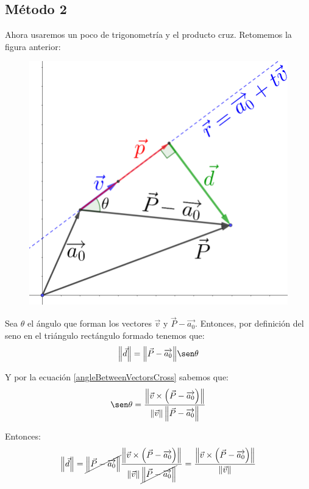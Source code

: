 \documentclass[12pt, fleqn]{report}                             %
\theoremstyle{break}                                            %
\newcommand{\Wrap}[1]{\left( #1 \right)}                        %
\newcommand{\Abs}[1]{\left\lVert #1 \right\lVert}               %
\newcommand{\lVec}[1]{\overrightarrow{#1}}                      %
\begin{document}
	    	\subsection{Método 2}
	    	Ahora usaremos un poco de trigonometría y el producto cruz. Retomemos la figura anterior:
	    	
	    	\begin{figure}[H]
	    		\centering
	    		\includegraphics[scale=1.65]{distancePointLine2.png}
	    	\end{figure}
    	
    		Sea $\theta$ el ángulo que forman los vectores $\vec{v}$ y $\vec{P} - \lVec{a_0}$. Entonces, por definición del seno en el triángulo rectángulo formado tenemos que:
    		\begin{align}
	    		\Abs{\vec{d}} = {\Abs{\vec{P} - \lVec{a_0}}} \sen \theta
    		\end{align}
    		
    		Y por la ecuación \ref{angleBetweenVectorsCross} sabemos que:
    		\begin{align}
	    		\sen \theta = \dfrac{\Abs{\vec{v} \times \Wrap{\vec{P} - \lVec{a_0}}}}{\Abs{\vec{v}} \Abs{\vec{P} - \lVec{a_0}}}
    		\end{align}
    		
    		Entonces:
    		\begin{align}
	    		\Abs{\vec{d}} = {\cancel{\Abs{\vec{P} - \lVec{a_0}}}} \dfrac{\Abs{\vec{v} \times \Wrap{\vec{P} - \lVec{a_0}}}}{\Abs{\vec{v}} \cancel{\Abs{\vec{P} - \lVec{a_0}}}} = \dfrac{\Abs{\vec{v} \times \Wrap{\vec{P} - \lVec{a_0}}}}{\Abs{\vec{v}}} \label{distancePointLine2}
    		\end{align}
    		
\end{document}
